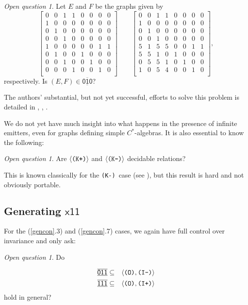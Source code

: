 \documentclass[12pt]{amsbook}%
\theoremstyle{defin}
\theoremstyle{remark}
\newtheorem{openq}[theor]{Open question}
\numberwithin{equation}{chapter}
\numberwithin{theor}{section}
\newcommand{\xyz}[1]{\mbox{$\mathsf{#1}$}}
\newcommand{\xyzrel}[1]{\mbox{$\overline{\underline{\mathsf{ #1}}}$}}
\newcommand{\IIIm}{\mbox{\texttt{\textup{(I-)}}}}
\newcommand{\IIIp}{\mbox{\texttt{\textup{(I+)}}}}
\newcommand{\OOO}{\mbox{\texttt{\textup{(O)}}}}
\newcommand{\KKKp}{\mbox{\texttt{\textup{(K+)}}}}
\newcommand{\KKKm}{\mbox{\texttt{\textup{(K-)}}}}
\begin{document}
\begin{openq}
Let $E$ and $F$ be the graphs given by
\[
\begin{bmatrix}
0&0&1&1&0&0&0&0\\
1&0&0&0&0&0&0&0\\
0&1&0&0&0&0&0&0\\
0&0&1&0&0&0&0&0\\
1&0&0&0&0&0&1&1\\
0&1&0&0&1&0&0&0\\
0&0&1&0&0&1&0&0\\
0&0&0&1&0&0&1&0\\\end{bmatrix}\qquad
\begin{bmatrix}
0&0&1&1&0&0&0&0\\
1&0&0&0&0&0&0&0\\
0&1&0&0&0&0&0&0\\
0&0&1&0&0&0&0&0\\
5&1&5&5&0&0&1&1\\
5&5&1&0&1&0&0&0\\
0&5&5&1&0&1&0&0\\
1&0&5&4&0&0&1&0\\\end{bmatrix},
\]
respectively. Is $(E,F)\in \xyzrel{010}$?
\end{openq}

The authors' substantial, but not yet successful, efforts to solve this problem is detailed in \cite{tmcadse:selcka}, \cite{bbader:ehcgc}, \cite{bbader:serlc}.

We do not yet have much insight into what happens in the presence of infinite emitters, even for graphs defining simple $C^*$-algebras. It is also essential to know the following:

\begin{openq}
Are $\langle \KKKp\rangle$ and $\langle \KKKm\rangle$ decidable relations?
\end{openq}

This is known classically for the \KKKm\ case (see \cite{khkfwr:dse}), but this result is hard and not obviously portable.

\subsection{Generating  \xyz{x11}}

For the  (\ref{gencon}.3) and (\ref{gencon}.7) cases, we again have full control over invariance and only ask:

\begin{openq} Do
\addtocounter{equation}{-1}
\begin{eqnarray*}
\xyzrel{011}&\subseteq&\langle \OOO,\IIIm\rangle\\
\xyzrel{111}&\subseteq&\langle \OOO,\IIIp\rangle
\end{eqnarray*}
hold in general?\end{openq}
\end{document}
